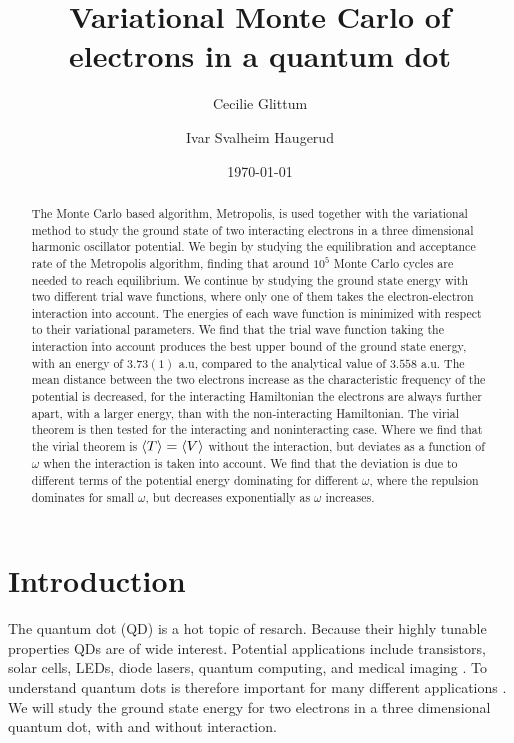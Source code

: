 \documentclass[%
 reprint,
nofootinbib,
aps,
]{revtex4-1}
\begin{document}

\title{Variational Monte Carlo of electrons in a quantum dot}%

\author{Cecilie Glittum}
\author{Ivar Svalheim Haugerud}

%


\date{\today}%

\begin{abstract}
  The Monte Carlo based algorithm, Metropolis, is used together with the variational method to study the ground state of two interacting electrons in a three dimensional harmonic oscillator potential. We begin by studying the equilibration and acceptance rate of the Metropolis algorithm, finding that around $10^5$ Monte Carlo cycles are needed to reach equilibrium. We continue by studying the ground state energy with two different trial wave functions, where only one of them takes the electron-electron interaction into account. The energies of each wave function is minimized with respect to their variational parameters. We find that the trial wave function taking the interaction into account produces the best upper bound of the ground state energy, with an energy of $3.73(1)$ a.u, compared to the analytical value of $3.558$ a.u. The mean distance between the two electrons increase as the characteristic frequency of the potential is decreased, for the interacting Hamiltonian the electrons are always further apart, with a larger energy, than with the non-interacting Hamiltonian.
  The virial theorem is then tested for the interacting and noninteracting case. Where we find that the virial theorem is $\ev{T} = \ev{V}$ without the interaction, but deviates as a function of $\omega$ when the interaction is taken into account. We find that the deviation is due to different terms of the potential energy dominating for different $\omega$, where the repulsion dominates for small $\omega$, but decreases exponentially as $\omega$ increases.
\end{abstract}
\maketitle


\section{Introduction}
The quantum dot (QD) is a hot topic of resarch. Because their highly tunable properties QDs are of wide interest. Potential applications include transistors, solar cells, LEDs, diode lasers, quantum computing, and medical imaging \cite{Q_DOTS}. To understand quantum dots is therefore important for many different applications \cite{rapport2}. We will study the ground state energy for two electrons in a three dimensional quantum dot, with and without interaction.
\end{document}
